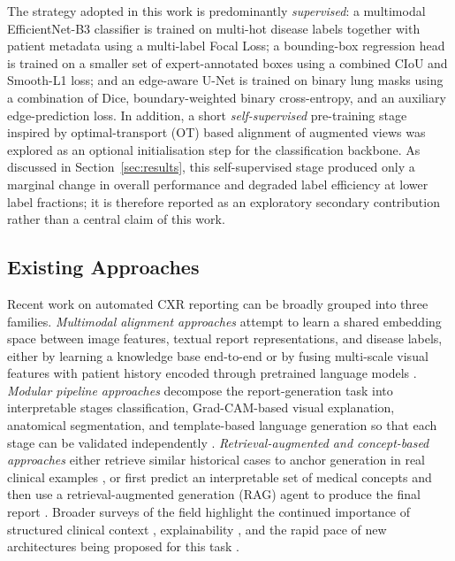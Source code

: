 \documentclass[preprint,12pt,authoryear]{elsarticle}
\begin{document}
The strategy adopted in this work is predominantly \emph{supervised}: a multimodal EfficientNet-B3 classifier is trained on multi-hot disease labels together with patient metadata using a multi-label Focal Loss; a bounding-box regression head is trained on a smaller set of expert-annotated boxes using a combined CIoU and Smooth-L1 loss; and an edge-aware U-Net is trained on binary lung masks using a combination of Dice, boundary-weighted binary cross-entropy, and an auxiliary edge-prediction loss. In addition, a short \emph{self-supervised} pre-training stage inspired by optimal-transport (OT) based alignment of augmented views was explored as an optional initialisation step for the classification backbone. As discussed in Section~\ref{sec:results}, this self-supervised stage produced only a marginal change in overall performance and degraded label efficiency at lower label fractions; it is therefore reported as an exploratory secondary contribution rather than a central claim of this work.

\subsection{Existing Approaches}
\label{sec:existing}

Recent work on automated CXR reporting can be broadly grouped into three families. \emph{Multimodal alignment approaches} attempt to learn a shared embedding space between image features, textual report representations, and disease labels, either by learning a knowledge base end-to-end \citep{yang_knowledge} or by fusing multi-scale visual features with patient history encoded through pretrained language models \citep{mmg_fusion}. \emph{Modular pipeline approaches} decompose the report-generation task into interpretable stages classification, Grad-CAM-based visual explanation, anatomical segmentation, and template-based language generation so that each stage can be validated independently \citep{ihras}. \emph{Retrieval-augmented and concept-based approaches} either retrieve similar historical cases to anchor generation in real clinical examples \citep{xrem}, or first predict an interpretable set of medical concepts and then use a retrieval-augmented generation (RAG) agent to produce the final report \citep{concept_rag}. Broader surveys of the field highlight the continued importance of structured clinical context \citep{integrative_multimodal}, explainability \citep{xai_survey}, and the rapid pace of new architectures being proposed for this task \citep{pmc_advancements,awesome_rrg}.
\end{document}
